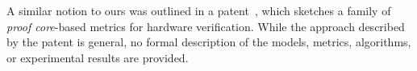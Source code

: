 %
A similar notion to ours was outlined in a patent~\cite{hanna2015formal}, which sketches a family of {\em proof core}-based metrics for hardware verification.  While the approach described by the patent is general, no formal description of the models, metrics, algorithms, or experimental results are provided.%



